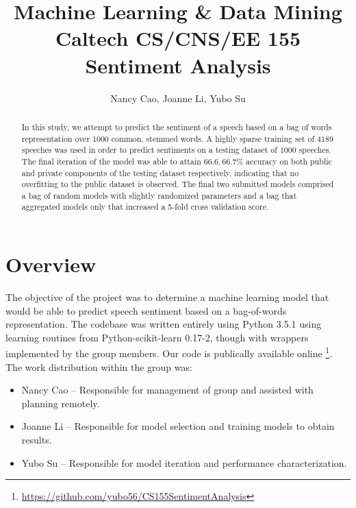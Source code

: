 \documentclass[10pt, preprint2]{aastex}
\begin{document}
\pagestyle{fancy}
\cfoot{\thepage/\pageref{LastPage}}

\title{Machine Learning \& Data Mining\\
      Caltech CS/CNS/EE 155 \\[1pt]
      Sentiment Analysis}
\author{Nancy Cao, Joanne Li, Yubo Su}

\begin{abstract}
In this study, we attempt to predict the sentiment of a speech based on a bag of words representation over 1000 common, stemmed words. A highly sparse training set of $4189$ speeches was used in order to predict sentiments on a testing dataset of $1000$ speeches. The final iteration of the model was able to attain $66.6, 66.7\%$ accuracy on both public and private components of the testing dataset respectively, indicating that no overfitting to the public dataset is observed. The final two submitted models comprised a bag of random models with slightly randomized parameters and a bag that aggregated models only that increased a 5-fold cross validation score.
\end{abstract}

\section{Overview}

The objective of the project was to determine a machine learning model that would be able to predict speech sentiment based on a bag-of-words representation. The codebase was written entirely using Python 3.5.1 using learning routines from Python-scikit-learn 0.17-2, though with wrappers implemented by the group members. Our code is publically available online \footnote{\url{https://github.com/yubo56/CS155SentimentAnalysis}}. The work distribution within the group was:
\begin{itemize}
    \item Nancy Cao -- Responsible for management of group and assisted with planning remotely.
    \item Joanne Li -- Responsible for model selection and training models to obtain results.
    \item Yubo Su -- Responsible for model iteration and performance characterization.
\end{itemize}
\end{document}
